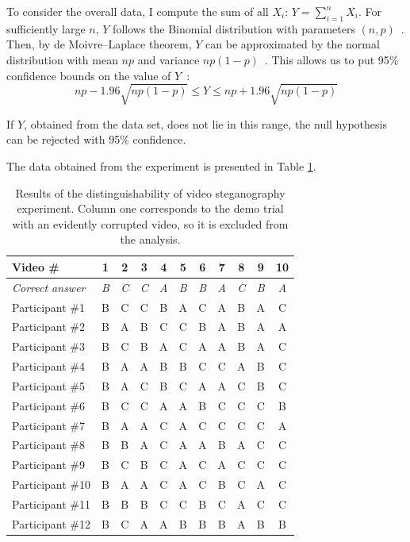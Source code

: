 \documentclass[12pt,british,twoside,notitlepage,usenames,dvipsnames,hypens,final]{report}
\numberwithin{equation}{section}
\numberwithin{figure}{section}
\begin{document}
To consider the overall data, I compute the sum of all $X_i$: $Y = \sum^n_{i=1} X_i$. For sufficiently large $n$, $Y$ follows the Binomial distribution with parameters $(n, p)$~\cite[p.~53]{papoulis2002probability}. Then, by de Moivre--Laplace theorem, $Y$ can be approximated by the normal distribution with mean $np$ and variance $np(1-p)$~\cite[p.~105]{papoulis2002probability}. This allows us to put 95\% confidence bounds on the value of $Y$~\cite[p.~316--318]{ai2-notes}:
\[ np - 1.96 \sqrt{np(1-p)}  \leq Y \leq  np + 1.96 \sqrt{np(1-p)} \]

If $Y$, obtained from the data set, does not lie in this range, the null hypothesis can be rejected with 95\% confidence.

The data obtained from the experiment is presented in Table \ref{tbl:detect-exp-res}. 

\begin{table}[tbh]
\centering
\bgroup
\def\arraystretch{1.3}%
\begin{tabular}{|l|c|c|c|c|c|c|c|c|c|c|}
\hline
\textbf{Video \#} & \textbf{1} & \textbf{2} & \textbf{3} & \textbf{4} & \textbf{5} & \textbf{6} & \textbf{7} & \textbf{8} & \textbf{9} & \textbf{10}\\
\hline
\textit{Correct answer} & \textit{B} & \textit{C} & \textit{C} & \textit{A} & \textit{B} & \textit{B} & \textit{A} & \textit{C} & \textit{B} & \textit{A}\\
\hline
Participant \#1  & B & C & C & B & A & C & A & B & A & C \\
Participant \#2  & B & A & B & C & C & B & A & B & A & A \\
Participant \#3  & B & C & B & A & C & A & A & B & A & C \\
Participant \#4  & B & A & A & B & B & C & C & A & B & C \\
Participant \#5  & B & A & C & B & C & A & A & C & B & C \\
Participant \#6  & B & C & C & A & A & B & C & C & C & B \\
Participant \#7  & B & A & A & C & A & C & C & C & C & A \\
Participant \#8  & B & B & A & C & A & A & B & A & C & C \\
Participant \#9  & B & C & B & C & A & C & A & C & C & C \\
Participant \#10 & B & A & A & C & A & C & B & C & A & C \\
Participant \#11 & B & B & B & C & C & B & C & A & C & C \\
Participant \#12 & B & C & A & A & B & B & B & A & B & B \\
\hline
\end{tabular}
\egroup
\caption{Results of the distinguishability of video steganography experiment. Column one corresponds to the demo trial with an evidently corrupted video, so it is excluded from the analysis.}
\label{tbl:detect-exp-res}
\end{table}
\end{document}
